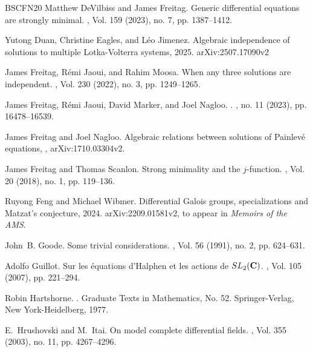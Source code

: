 \documentclass[12pt]{amsart}
\theoremstyle{definition}
\theoremstyle{plain}
\theoremstyle{exampstyle}
\theoremstyle{exampstyle}\newtheorem{thmxbis}{Theorem}
\numberwithin{equation}{section}
\theoremstyle{remark}
\begin{document}
\begin{thebibliography}{BSCFN20}
Matthew DeVilbiss and James Freitag.
\newblock Generic differential equations are strongly minimal.
, Vol. 159 (2023), no. 7, pp. 1387--1412.

Yutong Duan, Christine Eagles, and Léo Jimenez.
\newblock Algebraic independence of solutions to multiple {L}otka-{V}olterra
  systems, 2025.
 arXiv:2507.17090v2


James Freitag, R\'{e}mi Jaoui, and Rahim Moosa.
\newblock When any three solutions are independent.
, Vol. 230 (2022), no. 3, pp. 1249--1265.

James Freitag, Rémi Jaoui, David Marker, and Joel Nagloo.
.
, no. 11 (2023), pp. 16478--16539.

James Freitag and Joel Nagloo.
\newblock Algebraic relations between solutions of Painlevé equations,
, arXiv:1710.03304v2.

James Freitag and Thomas Scanlon.
\newblock Strong minimality and the {$j$}-function.
, Vol. 20 (2018), no. 1, pp. 119--136.

Ruyong Feng and Michael Wibmer.
\newblock Differential {G}alois groups, specializations and {M}atzat's conjecture,
  2024.
\newblock arXiv:2209.01581v2, to appear in {\em Memoirs of the AMS}.

John~B. Goode.
\newblock Some trivial considerations.
, Vol. 56 (1991), no. 2, pp. 624--631.

Adolfo Guillot.
\newblock Sur les \'{e}quations d'{H}alphen et les actions de {${\rm SL}_2({\bf
  C})$}.
, Vol. 105 (2007), pp. 221--294.

Robin Hartshorne.
.
\newblock Graduate Texts in Mathematics, No. 52. Springer-Verlag, New
  York-Heidelberg, 1977.

E.~Hrushovski and M.~Itai.
\newblock On model complete differential fields.
, Vol. 355 (2003), no. 11, pp. 4267--4296.


\end{thebibliography}
\end{document}

